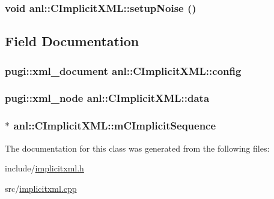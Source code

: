 \label{classanl_1_1CImplicitXML_a835b31bdfda2b630702871d4b874430c}
\hypertarget{classanl_1_1CImplicitXML_a7ce27d116ac066cf791c9ecd1906e935}{
\subsubsection[{setupNoise}]{\setlength{\rightskip}{0pt plus 5cm}void anl::CImplicitXML::setupNoise ()}}
\label{classanl_1_1CImplicitXML_a7ce27d116ac066cf791c9ecd1906e935}


\subsection{Field Documentation}
\hypertarget{classanl_1_1CImplicitXML_a50c5be8373543290385ac51d6608af87}{
\subsubsection[{config}]{\setlength{\rightskip}{0pt plus 5cm}pugi::xml\_\-document {\bf anl::CImplicitXML::config}}}
\label{classanl_1_1CImplicitXML_a50c5be8373543290385ac51d6608af87}
\hypertarget{classanl_1_1CImplicitXML_ad32053dc56a8e932b64101d1eed12a78}{
\subsubsection[{data}]{\setlength{\rightskip}{0pt plus 5cm}pugi::xml\_\-node {\bf anl::CImplicitXML::data}}}
\label{classanl_1_1CImplicitXML_ad32053dc56a8e932b64101d1eed12a78}
\hypertarget{classanl_1_1CImplicitXML_ad006f5e2fa937d44470ecc769c8ec404}{
\subsubsection[{mCImplicitSequence}]{$\ast$ {\bf anl::CImplicitXML::mCImplicitSequence}}}
\label{classanl_1_1CImplicitXML_ad006f5e2fa937d44470ecc769c8ec404}


The documentation for this class was generated from the following files:\begin{DoxyCompactItemize}
\item 
include/\hyperlink{implicitxml_8h}{implicitxml.h}\item 
src/\hyperlink{implicitxml_8cpp}{implicitxml.cpp}\end{DoxyCompactItemize}
